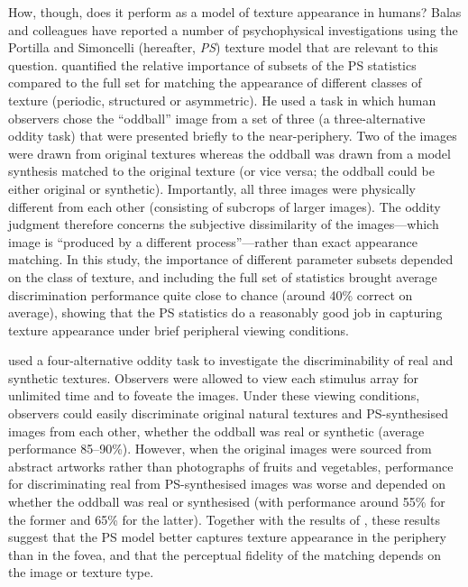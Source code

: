 \documentclass[article, 11pt,a4paper,natbib]{apa6}\usepackage[]{graphicx}\usepackage[]{color}
\begin{document}
How, though, does it perform as a model of texture appearance in humans? 
Balas and colleagues \citep{balas_texture_2006, balas_contrast_2012, balas_attentive_2008, balas_invariant_2015} have reported a number of psychophysical investigations using the Portilla and Simoncelli (hereafter, \textit{PS}) texture model that are relevant to this question.
\citet{balas_texture_2006} quantified the relative importance of subsets of the PS statistics compared to the full set for matching the appearance of different classes of texture (periodic, structured or asymmetric).
He used a task in which human observers chose the ``oddball'' image from a set of three (a three-alternative oddity task) that were presented briefly to the near-periphery.
Two of the images were drawn from original textures whereas the oddball was drawn from a model synthesis matched to the original texture (or vice versa; the oddball could be either original or synthetic).
Importantly, all three images were physically different from each other (consisting of subcrops of larger images). 
The oddity judgment therefore concerns the subjective dissimilarity of the images---which image is ``produced by a different process''---rather than exact appearance matching. 
In this study, the importance of different parameter subsets depended on the class of texture, and including the full set of statistics brought average discrimination performance quite close to chance (around 40\% correct on average), showing that the PS statistics do a reasonably good job in capturing texture appearance under brief peripheral viewing conditions.

\citet{balas_contrast_2012} used a four-alternative oddity task to investigate the discriminability of real and synthetic textures.
Observers were allowed to view each stimulus array for unlimited time and to foveate the images.
Under these viewing conditions, observers could easily discriminate original natural textures and PS-synthesised images from each other, whether the oddball was real or synthetic (average performance 85--90\%).
However, when the original images were sourced from abstract artworks rather than photographs of fruits and vegetables, performance for discriminating real from PS-synthesised images was worse and depended on whether the oddball was real or synthesised (with performance around 55\% for the former and 65\% for the latter).
Together with the results of \citet{balas_texture_2006}, these results suggest that the PS model better captures texture appearance in the periphery than in the fovea, and that the perceptual fidelity of the matching depends on the image or texture type.
\end{document}
